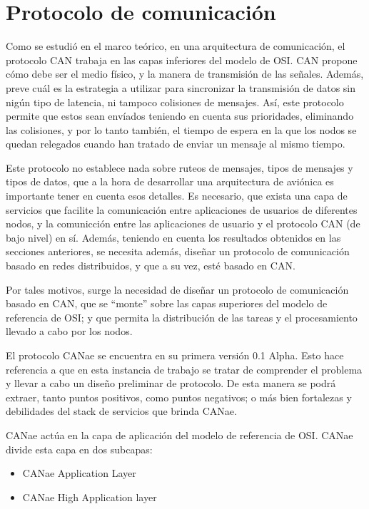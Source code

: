 \section{Protocolo de comunicación}
Como se estudió en el marco teórico, en una arquitectura
de comunicación, el protocolo CAN trabaja en las
capas inferiores del modelo de OSI. CAN propone cómo debe ser
el medio físico, y la manera de transmisión de las señales.
Además, preve cuál es la estrategia a utilizar  para sincronizar
la transmisión de datos sin nigún tipo de latencia, ni tampoco
colisiones de mensajes. Así, este protocolo permite que estos
sean envíados teniendo en cuenta sus prioridades, eliminando las colisiones, y
por lo tanto también, el tiempo de espera en la que los nodos se quedan
relegados cuando han tratado de enviar un mensaje al mismo tiempo.

Este protocolo no establece nada sobre ruteos de mensajes, tipos de mensajes y
tipos de datos, que a la hora de desarrollar una arquitectura de aviónica es
importante tener en cuenta esos detalles. Es necesario, que exista una
capa de servicios que facilite la comunicación entre aplicaciones de usuarios
de diferentes nodos, y la comunicción entre las aplicaciones de usuario
y el protocolo CAN (de bajo nivel) en sí.
Además, teniendo en cuenta los resultados obtenidos en las secciones
anteriores, se necesita además, diseñar un protocolo de comunicación
basado en redes distribuidos, y que a su vez, esté basado en CAN.

Por tales motivos, surge la necesidad
de diseñar un protocolo de comunicación basado en CAN, que se ``monte'' sobre
las capas superiores del modelo de referencia de OSI; y que permita
la distribución de las tareas y el procesamiento llevado a cabo
por los nodos. 

El protocolo CANae se encuentra en su primera versión 0.1 Alpha. Esto hace
referencia a que en esta instancia de trabajo se tratar de comprender
el problema y llevar a cabo un diseño preliminar de protocolo. De esta
manera se podrá extraer, tanto puntos positivos, como puntos negativos; o
más bien fortalezas y debilidades del stack de servicios que brinda CANae.

CANae actúa en la capa de aplicación del modelo de referencia de OSI. CANae
divide esta capa en dos subcapas:
\begin{itemize}
\item CANae Application Layer
\item CANae High Application layer
\end{itemize}

